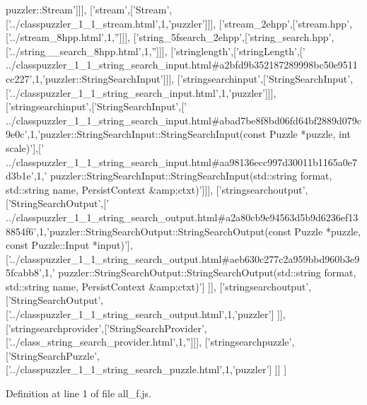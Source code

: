 \begin{DoxyCode}
{      puzzler::Stream'}]]],
  [\textcolor{stringliteral}{'stream'},[\textcolor{stringliteral}{'Stream'},[\textcolor{stringliteral}{'../classpuzzler\_1\_1\_stream.html'},1,\textcolor{stringliteral}{'puzzler'}]]],
  [\textcolor{stringliteral}{'stream\_2ehpp'},[\textcolor{stringliteral}{'stream.hpp'},[\textcolor{stringliteral}{'../stream\_8hpp.html'},1,\textcolor{stringliteral}{''}]]],
  [\textcolor{stringliteral}{'string\_5fsearch\_2ehpp'},[\textcolor{stringliteral}{'string\_search.hpp'},[\textcolor{stringliteral}{'../string\_\_search\_8hpp.html'},1,\textcolor{stringliteral}{''}]]],
  [\textcolor{stringliteral}{'stringlength'},[\textcolor{stringliteral}{'stringLength'},[\textcolor{stringliteral}{'
      ../classpuzzler\_1\_1\_string\_search\_input.html#a2bfd9b352187289998bc50e9511cc227'},1,\textcolor{stringliteral}{'puzzler::StringSearchInput'}]]],
  [\textcolor{stringliteral}{'stringsearchinput'},[\textcolor{stringliteral}{'StringSearchInput'},[\textcolor{stringliteral}{'../classpuzzler\_1\_1\_string\_search\_input.html'},1,\textcolor{stringliteral}{'puzzler'}]]],
  [\textcolor{stringliteral}{'stringsearchinput'},[\textcolor{stringliteral}{'StringSearchInput'},[\textcolor{stringliteral}{'
      ../classpuzzler\_1\_1\_string\_search\_input.html#abad7be8f8bd06fd64bf2889d079c9e0c'},1,\textcolor{stringliteral}{'puzzler::StringSearchInput::StringSearchInput(const Puzzle *puzzle, int scale)'}],[\textcolor{stringliteral}{'
      ../classpuzzler\_1\_1\_string\_search\_input.html#aa98136ecc997d30011b1165a0e7d3b1e'},1,\textcolor{stringliteral}{'
      puzzler::StringSearchInput::StringSearchInput(std::string format, std::string name, PersistContext &amp;ctxt)'}]]],
  [\textcolor{stringliteral}{'stringsearchoutput'},[\textcolor{stringliteral}{'StringSearchOutput'},[\textcolor{stringliteral}{'
      ../classpuzzler\_1\_1\_string\_search\_output.html#a2a80cb9e94563d5b9d6236ef138854f6'},1,\textcolor{stringliteral}{'puzzler::StringSearchOutput::StringSearchOutput(const Puzzle *puzzle, const
       Puzzle::Input *input)'}],[\textcolor{stringliteral}{'../classpuzzler\_1\_1\_string\_search\_output.html#aeb630c277c2a959bbd960b3e95fcabb8'},1,\textcolor{stringliteral}{'
      puzzler::StringSearchOutput::StringSearchOutput(std::string format, std::string name, PersistContext &amp;ctxt)'}]
      ]],
  [\textcolor{stringliteral}{'stringsearchoutput'},[\textcolor{stringliteral}{'StringSearchOutput'},[\textcolor{stringliteral}{'../classpuzzler\_1\_1\_string\_search\_output.html'},1,\textcolor{stringliteral}{'puzzler'}]
      ]],
  [\textcolor{stringliteral}{'stringsearchprovider'},[\textcolor{stringliteral}{'StringSearchProvider'},[\textcolor{stringliteral}{'../class\_string\_search\_provider.html'},1,\textcolor{stringliteral}{''}]]],
  [\textcolor{stringliteral}{'stringsearchpuzzle'},[\textcolor{stringliteral}{'StringSearchPuzzle'},[\textcolor{stringliteral}{'../classpuzzler\_1\_1\_string\_search\_puzzle.html'},1,\textcolor{stringliteral}{'puzzler'}]
      ]]
]
\end{DoxyCode}


Definition at line 1 of file all\+\_\+f.\+js.

